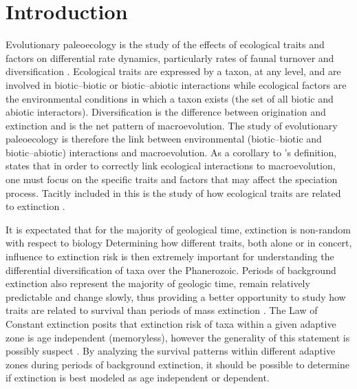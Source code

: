 \documentclass[12pt,letterpaper]{article}
\begin{document}
\section{Introduction} \label{sec:intro}
%
Evolutionary paleoecology is the study of the effects of ecological traits and factors on differential rate dynamics, particularly rates of faunal turnover and diversification \citep{Kitchell1985a}. Ecological traits are expressed by a taxon, at any level, and are involved in biotic--biotic or biotic--abiotic interactions while ecological factors are the environmental conditions in which a taxon exists (the set of all biotic and abiotic interactors). Diversification is the difference between origination and extinction and is the net pattern of macroevolution. The study of evolutionary paleoecology is therefore the link between environmental (biotic--biotic and biotic--abiotic) interactions and macroevolution. As a corollary to \citet{Kitchell1985a}'s definition, \citet{Allmon1994} states that in order to correctly link ecological interactions to macroevolution, one must focus on the specific traits and factors that may affect the speciation process. Tacitly included in this is the study of how ecological traits are related to extinction \citep{Kitchell1990}.

It is expectated that for the majority of geological time, extinction is non-random with respect to biology \citep{Jablonski1986} Determining how different traits, both alone or in concert, influence to extinction risk is then extremely important for understanding the differential diversification of taxa over the Phanerozoic. Periods of background extinction also represent the majority of geologic time, remain relatively predictable and change slowly, thus providing a better opportunity to study how traits are related to survival than periods of mass extinction \citep{Jablonski1986,Raup1988}. The Law of Constant extinction \citep{VanValen1973} posits that extinction risk of taxa within a given adaptive zone is age independent (memoryless), however the generality of this statement is possibly suspect \citep{Drake2014,Raup1975,Sepkoski1975,Finnegan2008}. By analyzing the survival patterns within different adaptive zones during periods of background extinction, it should be possible to determine if extinction is best modeled as age independent or dependent.
\end{document}
